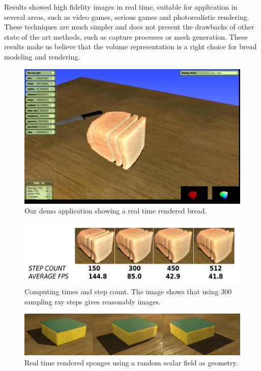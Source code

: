 Results showed high fidelity images in real time, suitable for application in several areas, such as video games, serious games \cite{Susi2007} and photorealistic rendering. 
These techniques are much simpler and does not present the drawbacks of other state of the art methods, such as capture processes or mesh generation.
These results make us believe that the volume representation is a right choice for bread modeling and rendering.


\begin{figure}
  \centerline{\includegraphics[width=13cm]{figures/application}}
  \caption{Our demo application showing a real time rendered bread.}
  \label{fg:application}
\end{figure}

\begin{figure}
  \centerline{\includegraphics[width=13cm]{figures/stepcount}}
  \caption{Computing times and step count. The image shows that using $300$ sampling ray steps gives reasonably images. }
  \label{fg:stepcount}
\end{figure}

\begin{figure}
  \centerline{\includegraphics[width=13cm]{figures/sponges}}
  \caption{Real time rendered sponges using a random scalar field as geometry.}
  \label{fg:sponges}
\end{figure}

